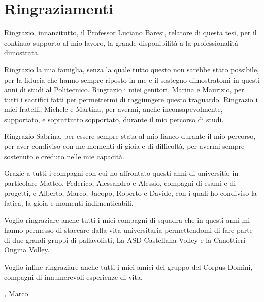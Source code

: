 %
%
\cleardoublepage
%
%
%
\chapter*{Ringraziamenti}
%
\par Ringrazio, innanzitutto, il Professor Luciano Baresi, relatore di questa tesi, per il continuo supporto al mio lavoro, la grande disponibilità a la professionalità dimostrata.\\
\par Ringrazio la mia famiglia, senza la quale tutto questo non sarebbe stato possibile, per la fiducia che hanno sempre riposto in me e il sostegno dimostratomi in questi anni di studi al Politecnico. Ringrazio i miei genitori, Marina e Maurizio, per tutti i sacrifici fatti per permettermi di raggiungere questo traguardo. Ringrazio i miei fratelli, Michele e Martina, per avermi, anche inconsapevolmente, supportato, e soprattutto sopportato, durante il mio percorso di studi.\\
\par Ringrazio Sabrina, per essere sempre stata al mio fianco durante il mio percorso, per aver condiviso con me momenti di gioia e di difficoltà, per avermi sempre sostenuto e creduto nelle mie capacità.\\
\par Grazie a tutti i compagni con cui ho affrontato questi anni di università: in particolare Matteo, Federico, Alessandro e Alessio, compagni di esami e di progetti, e Alberto, Marco, Jacopo, Roberto e Davide, con i quali ho condiviso la fatica, la gioia e momenti indimenticabili.\\
\par Voglio ringraziare anche tutti i miei compagni di squadra che in questi anni mi hanno permesso di staccare dalla vita universitaria permettendomi di fare parte di due grandi gruppi di pallavolisti, La ASD Castellana Volley e la Canottieri Ongina Volley.\\
\par Voglio infine ringraziare anche tutti i miei amici del gruppo del Corpus Domini, compagni di innumerevoli esperienze di vita.


\bigskip
\bigskip
\bigskip
\bigskip
\bigskip
\bigskip
\bigskip
\bigskip
\bigskip
\bigskip
 
\noindent\textit{\myLocation, \myTime}
\hfill Marco
%
